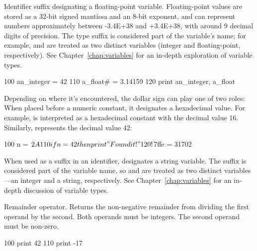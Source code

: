 \begin{entry}
Identifier suffix designating a floating-point variable. Floating-point values are stored as a 32-bit signed mantissa and an 8-bit exponent, and can represent numbers approximately between -3.4E+38 and +3.4E+38, with around 9 decimal digits of precision. The type suffix is considered part of the variable's name; for example,  and  are treated as two distinct variables (integer and floating-point, respectively). See Chapter~\ref{chap:variables} for an in-depth exploration of variable types.

\begin{lstexample}
100 an_integer = 42
110 a_float# = 3.14159
120 print an_integer, a_float
\end{lstexample}
\end{entry}

\begin{entry}
Depending on where it's encountered, the dollar sign can play one of two roles:\\

When placed before a numeric constant, it designates a hexadecimal value. For example,  is interpreted as a hexadecimal constant with the decimal value 16. Similarly,  represents the decimal value 42:

\begin{lstexample}
100 n = $2A
110 if n = 42 then print "Found it!"
120 !$7ffe = 31702
\end{lstexample}

When used as a suffix in an identifier, \code{\$} designates a string variable. The suffix is considered part of the variable name, so  and  are treated as two distinct variables---an integer and a string, respectively. See Chapter~\ref{chap:variables} for an in-depth discussion of variable types.

\end{entry}

\begin{entry}
Remainder operator. Returns the non-negative remainder from dividing the first operand by the second. Both operands must be integers. The second operand must be non-zero.

\begin{lstexample}
100 print 42 %
110 print -17 %
\end{lstexample}
\end{entry}

